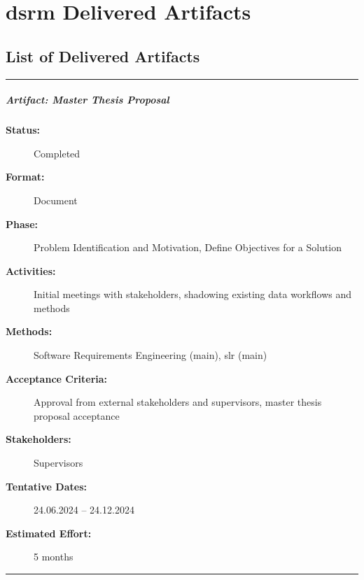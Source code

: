 
\chapter{\acrshort{dsrm} Delivered Artifacts}
\label{chap:artifacts-list}

\section{List of Delivered Artifacts}
\label{appex:dsrm-artifacts}


\noindent\rule{13cm}{0.3pt}

\paragraph{Artifact: Master Thesis Proposal}
\begin{description}
  \item[\textbf{Status:}] Completed
  \item[\textbf{Format:}] Document
  \item[\textbf{Phase:}] Problem Identification and Motivation, Define Objectives for a Solution
  \item[\textbf{Activities:}] Initial meetings with stakeholders, shadowing existing data workflows and methods
  \item[\textbf{Methods:}] Software Requirements Engineering (main), \acrshort{slr} (main)
  \item[\textbf{Acceptance Criteria:}] Approval from external stakeholders and supervisors, master thesis proposal acceptance
  \item[\textbf{Stakeholders:}] Supervisors
  \item[\textbf{Tentative Dates:}] 24.06.2024 – 24.12.2024
  \item[\textbf{Estimated Effort:}] 5 months
\end{description}

\noindent\rule{13cm}{0.3pt}

